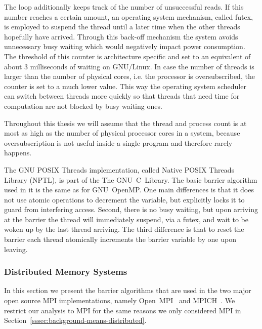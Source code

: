 \documentclass[a4paper, 10pt]{article}
\begin{document}
The loop additionally keeps track of the number of unsuccessful reads. If this number reaches a certain amount, an operating system mechanism, called futex\cite{franke2002}, is employed to suspend the thread until a later time when the other threads hopefully have arrived. Through this back-off mechanism the system avoids unnecessary busy waiting which would negatively impact power consumption. The threshold of this counter is architecture specific and set to an equivalent of about 3 milliseconds of waiting on GNU/Linux. In case the number of threads is larger than the number of physical cores, i.e. the processor is oversubscribed, the counter is set to a much lower value. This way the operating system scheduler can switch between threads more quickly so that threads that need time for computation are not blocked by busy waiting ones.

Throughout this thesis we will assume that the thread and process count is at most as high as the number of physical processor cores in a system, because oversubscription is not useful inside a single program and therefore rarely happens.

The GNU POSIX Threads implementation, called Native POSIX Threads Library (NPTL), is part of the The GNU~C~Library.
The basic barrier algorithm used in it is the same as for GNU~OpenMP. One main differences is that it does not use atomic operations to decrement the variable, but explicitly locks it to guard from interfering access. Second, there is no busy waiting, but upon arriving at the barrier the thread will immediately suspend, via a futex, and wait to be woken up by the last thread arriving. The third difference is that to reset the barrier each thread atomically increments the barrier variable by one upon leaving.

\subsubsection{Distributed Memory Systems}
\label{sssec:background-currently-used-distributed}

In this section we present the barrier algorithms that are used in the two major open source MPI implementations, namely Open~MPI~\cite{openmpi} and MPICH~\cite{mpich}. We restrict our analysis to MPI for the same reasons we only considered MPI in Section~\ref{sssec:background-means-distributed}.
\end{document}
